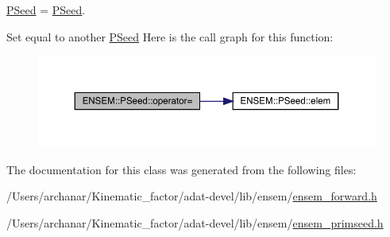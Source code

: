 \mbox{\hyperlink{classENSEM_1_1PSeed}{P\+Seed}} = \mbox{\hyperlink{classENSEM_1_1PSeed}{P\+Seed}}. 

Set equal to another \mbox{\hyperlink{classENSEM_1_1PSeed}{P\+Seed}} Here is the call graph for this function\+:
\nopagebreak
\begin{figure}[H]
\begin{center}
\leavevmode
\includegraphics[width=350pt]{dc/d14/classENSEM_1_1PSeed_a22c88645227bfddbfea703ed71117795_cgraph}
\end{center}
\end{figure}


The documentation for this class was generated from the following files\+:\begin{DoxyCompactItemize}
\item 
/\+Users/archanar/\+Kinematic\+\_\+factor/adat-\/devel/lib/ensem/\mbox{\hyperlink{adat-devel_2lib_2ensem_2ensem__forward_8h}{ensem\+\_\+forward.\+h}}\item 
/\+Users/archanar/\+Kinematic\+\_\+factor/adat-\/devel/lib/ensem/\mbox{\hyperlink{adat-devel_2lib_2ensem_2ensem__primseed_8h}{ensem\+\_\+primseed.\+h}}\end{DoxyCompactItemize}
